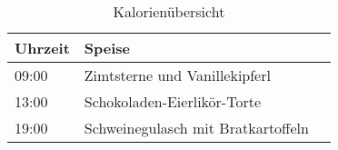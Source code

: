 \documentclass{scrartcl}
\begin{document}
\newcommand{\zeit}[2]{ #1:#2}

\begin{table}
\centering
\caption{Kalorienübersicht}
\label{tab:kalorien}
\begin{tabular}{lll}
\toprule
\textbf{Uhrzeit} & \textbf{Speise} \\ \midrule
\zeit{09}{00} & Zimtsterne und Vanillekipferl \\
\zeit{13}{00} & Schokoladen-Eierlikör-Torte \\
\zeit{19}{00} & Schweinegulasch mit Bratkartoffeln \\
\end{tabular}
\end{table}
\end{document}
